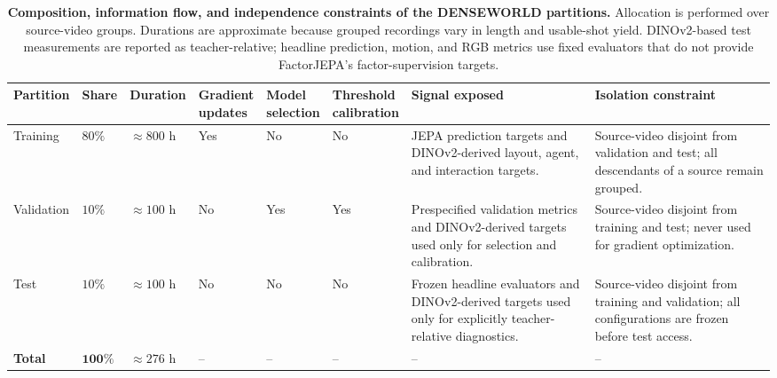 \begin{table}[t]
\centering
\caption{
\textbf{Composition, information flow, and independence constraints of
the DENSEWORLD partitions.}
Allocation is performed over source-video groups. Durations are
approximate because grouped recordings vary in length and usable-shot
yield. DINOv2-based test measurements are reported as teacher-relative;
headline prediction, motion, and RGB metrics use fixed evaluators that
do not provide FactorJEPA's factor-supervision targets.
}
\label{tab:dataset_partitions}
\scriptsize
\setlength{\tabcolsep}{3pt}
\renewcommand{\arraystretch}{1.14}
\begin{tabular}{
    p{}
    p{}
    p{}
    p{}
    p{}
    p{}
    p{}
    p{}
}
\toprule
\textbf{Partition}
&
\textbf{Share}
&
\textbf{Duration}
&
\shortstack{\textbf{Gradient}\\\textbf{updates}}
&
\shortstack{\textbf{Model}\\\textbf{selection}}
&
\shortstack{\textbf{Threshold}\\\textbf{calibration}}
&
\textbf{Signal exposed}
&
\textbf{Isolation constraint}
\\
\midrule

Training
&
\(80\%\)
&
\(\approx800\) h
&
Yes
&
No
&
No
&
JEPA prediction targets and DINOv2-derived layout, agent, and
interaction targets.
&
Source-video disjoint from validation and test; all descendants of a
source remain grouped.
\\

Validation
&
\(10\%\)
&
\(\approx100\) h
&
No
&
Yes
&
Yes
&
Prespecified validation metrics and DINOv2-derived targets used only
for selection and calibration.
&
Source-video disjoint from training and test; never used for gradient
optimization.
\\

Test
&
\(10\%\)
&
\(\approx100\) h
&
No
&
No
&
No
&
Frozen headline evaluators and DINOv2-derived targets used only for
explicitly teacher-relative diagnostics.
&
Source-video disjoint from training and validation; all configurations
are frozen before test access.
\\

\midrule

\textbf{Total}
&
\(\mathbf{100\%}\)
&
\(\approx276\) h
&
-- & -- & -- & -- & --
\\

\bottomrule
\end{tabular}
\end{table}

